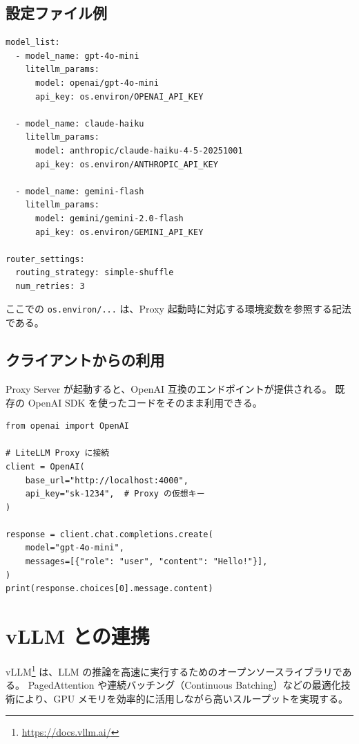 \documentclass[a4paper,11pt]{ltjsarticle}
\newcommand{\code}[1]{\texttt{#1}}
\begin{document}
\subsection{設定ファイル例}

\begin{lstlisting}[style=python, caption={Proxy Server 設定ファイル（\code{config.yaml}）}]
model_list:
  - model_name: gpt-4o-mini
    litellm_params:
      model: openai/gpt-4o-mini
      api_key: os.environ/OPENAI_API_KEY

  - model_name: claude-haiku
    litellm_params:
      model: anthropic/claude-haiku-4-5-20251001
      api_key: os.environ/ANTHROPIC_API_KEY

  - model_name: gemini-flash
    litellm_params:
      model: gemini/gemini-2.0-flash
      api_key: os.environ/GEMINI_API_KEY

router_settings:
  routing_strategy: simple-shuffle
  num_retries: 3
\end{lstlisting}

ここでの \code{os.environ/...} は、Proxy 起動時に対応する環境変数を参照する記法である。

\subsection{クライアントからの利用}

Proxy Server が起動すると、OpenAI 互換のエンドポイントが提供される。
既存の OpenAI SDK を使ったコードをそのまま利用できる。

\begin{lstlisting}[style=python, caption={Proxy Server へのアクセス例}]
from openai import OpenAI

# LiteLLM Proxy に接続
client = OpenAI(
    base_url="http://localhost:4000",
    api_key="sk-1234",  # Proxy の仮想キー
)

response = client.chat.completions.create(
    model="gpt-4o-mini",
    messages=[{"role": "user", "content": "Hello!"}],
)
print(response.choices[0].message.content)
\end{lstlisting}


\section{vLLM との連携}
\label{sec:vllm}

vLLM\footnote{\url{https://docs.vllm.ai/}} は、LLM の推論を高速に実行するためのオープンソースライブラリである。
PagedAttention や連続バッチング（Continuous Batching）などの最適化技術により、GPU メモリを効率的に活用しながら高いスループットを実現する。
\end{document}
